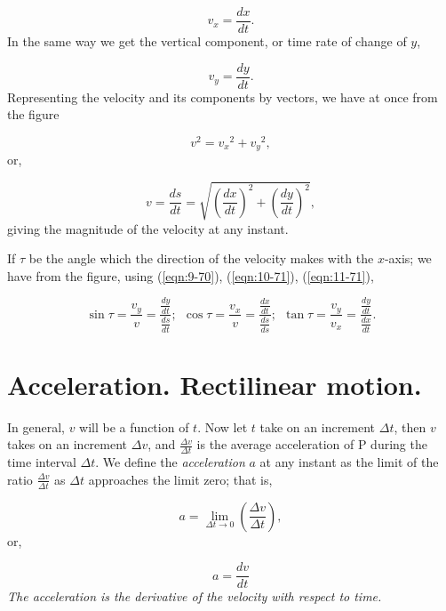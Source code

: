 \begin{equation}
v_x = \frac{dx}{dt}.
\label{eqn:10-71}
\end{equation}	
In the same way we get the vertical component, or time rate of change of $y$,

\begin{equation}
v_y = \frac{dy}{dt}.
\label{eqn:11-71}
\end{equation}	
Representing the velocity and its components by vectors, we have at once from the figure

\[
    v^2 = {v_x}^2 + {v_y}^2,
\]
or,

\begin{equation}
v = \frac{ds}{dt} 
= \sqrt{\left ( \frac{dx}{dt} \right )^2 + \left ( \frac{dy}{dt} \right )^2},
\label{eqn:12-71}
\end{equation}	
giving the magnitude of the velocity at any instant.

If $\tau$ be the angle which the direction of the velocity makes 
with the $x$-axis; we have from the figure, using (\ref{eqn:9-70}), 
(\ref{eqn:10-71}), (\ref{eqn:11-71}),

\begin{equation}
\sin \tau = \frac{v_y}{v} 
= \frac{\frac{dy}{dt}}{\frac{ds}{dt}}; \ \ 
\cos \tau = \frac{v_x}{v} = \frac{\frac{dx}{dt}}{\frac{ds}{ds}}; 
\ \ \tan \tau = \frac{v_y}{v_x} = \frac{\frac{dy}{dt}}{\frac{dx}{dt}}.
\label{eqn:13-71}
\end{equation}

\section{Acceleration. Rectilinear motion.} 

In general, $v$ will be a function of $t$. 
Now let $t$ take on an increment $\Delta t$, then $v$ takes 
on an increment $\Delta v$, and
$\frac{\Delta v}{\Delta t}$ is the average acceleration of 
P during the time interval $\Delta t$.
We define the {\it acceleration} $a$ at any instant as the 
limit of the ratio $\frac{\Delta v}{\Delta t}$ as $\Delta t$ approaches 
the limit zero; that is,

\[
a = \lim_{\Delta t \to 0} \left ( \frac{\Delta v}{\Delta t} \right ),
\]
or,

\begin{equation}
a = \frac{dv}{dt}
\label{eqn:14-72}
\end{equation}
{\it The acceleration is the derivative of the velocity with respect to time.}

